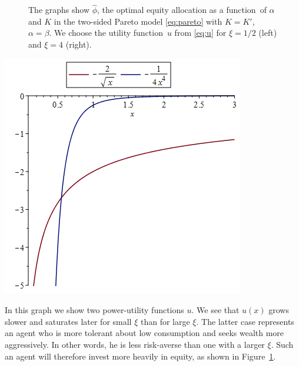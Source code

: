 \documentclass[11pt,a4]{amsart}
\newcommand{\fct}{function}
\newcommand{\1}{{\mathbf 1}}
\begin{document}
\begin{figure}[htb!]
\begin{minipage}{0.5\linewidth}
  \end{minipage}
 \caption{The graphs show $\hat\phi$, the optimal equity allocation
    as a \fct\ of $\alpha$ and $K$ in the two-sided Pareto model
    \eqref{eq:pareto} with $K=K'$, $\alpha=\beta$. We choose
    the utility \fct\ $u$ from \eqref{eq:u}
    for $\xi = 1/2$ (left) and $\xi = 4$
    (right).
  }
  \label{fig:phi_hat_pareto}
\end{figure}

\begin{minipage}{0.5\linewidth}
  \includegraphics[width=\textwidth]{power_utilities.png}
\end{minipage}\hfill
\begin{minipage}{0.42\textwidth}
  In this graph we show two power-utility functions $u$. We see that
  $u(x)$ grows slower and saturates later for small $\xi$ than for
  large $\xi$. The latter case represents an agent who is more
  tolerant about low consumption and seeks wealth more
  aggressively. In other words, he is less risk-averse than one with a
  larger $\xi$. Such an agent will therefore invest more heavily in
  equity, as shown in Figure~\ref{fig:phi_hat_pareto}.
\end{minipage}
\end{document}
